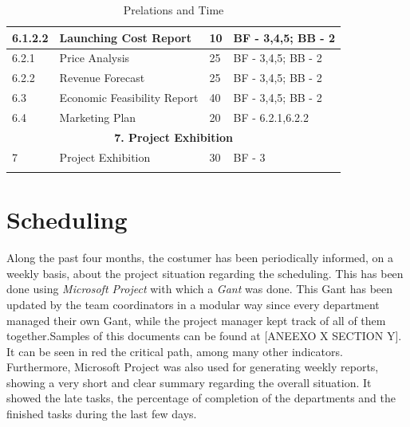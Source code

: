 \begin{longtable}{ | p{1.3cm} | p{5cm} | p{3cm} | p{3.5cm} |}
6.1.2.2 & Launching Cost Report  & 10 & BF - 3,4,5; BB - 2 \\ \hline
6.2.1 & Price Analysis & 25 & BF - 3,4,5; BB - 2 \\ \hline
6.2.2 & Revenue Forecast & 25 & BF - 3,4,5; BB - 2 \\ \hline
6.3 & Economic Feasibility Report & 40 & BF - 3,4,5; BB - 2  \\ \hline
6.4 & Marketing Plan & 20 & BF - 6.2.1,6.2.2 \\ \hline
\multicolumn{4}{|c|}{\textbf{7. Project Exhibition}} \\ \hline
7 & Project Exhibition &30 & BF - 3 \\ \hline
\caption{Prelations and Time} \\
\end{longtable}

\section{Scheduling}
Along the past four months, the costumer has been periodically informed, on a weekly basis, about the project situation regarding the scheduling. This has been done using \textit{Microsoft Project} with which a \textit{Gant} was done. This Gant has been updated by the team coordinators in a modular way since every department managed their own Gant, while the project manager kept track of all of them together.Samples of this documents can be found at [{ANEEXO X SECTION Y}]. It can be seen in red the critical path, among many other indicators. Furthermore, Microsoft Project was also used for generating weekly reports, showing a very short and clear summary regarding the overall situation. It showed the late tasks, the percentage of completion of the departments and the finished tasks during the last few days.



